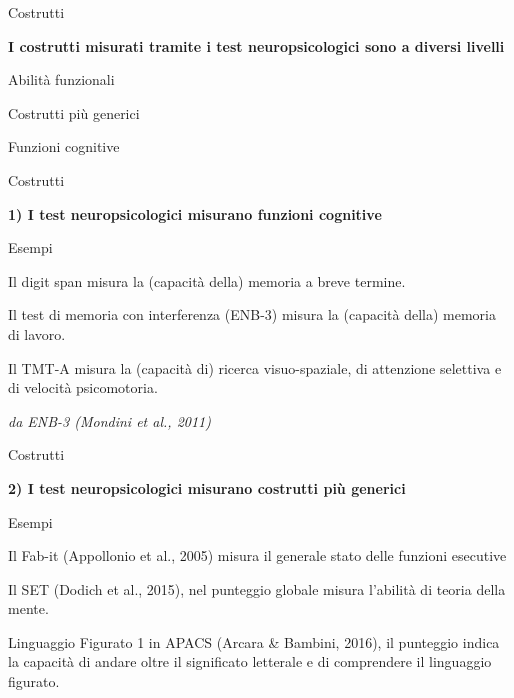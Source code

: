 \documentclass[
  ignorenonframetext,
]{beamer}
\begin{document}
\begin{frame}{Costrutti}
\label{costrutti-1}
\begin{center}
  \textbf{I costrutti misurati tramite i test neuropsicologici sono a diversi livelli}
  \vspace{2em}

  Abilità funzionali
  
  {\small Costrutti più generici}
  
  {\footnotesize Funzioni cognitive}
\end{center}
\end{frame}

\begin{frame}{Costrutti}
\label{costrutti-2}
\begin{center}
  \textbf{1) I test neuropsicologici misurano funzioni cognitive}
\end{center}
\vspace{2em}

Esempi

Il digit span misura la (capacità della) memoria a breve termine.

Il test di memoria con interferenza (ENB-3) misura la (capacità della)
memoria di lavoro.

Il TMT-A misura la (capacità di) ricerca visuo-spaziale, di attenzione
selettiva e di velocità psicomotoria.

\begin{flushright}
  \textit{da ENB-3 (Mondini et al., 2011)}
\end{flushright}
\end{frame}

\begin{frame}{Costrutti}
\label{costrutti-3}
\begin{center}
  \textbf{2) I test neuropsicologici misurano costrutti più generici}
\end{center}
\vspace{2em}

Esempi

Il Fab-it (Appollonio et al., 2005) misura il generale stato delle
funzioni esecutive

Il SET (Dodich et al., 2015), nel punteggio globale misura l'abilità di
teoria della mente.

Linguaggio Figurato 1 in APACS (Arcara \& Bambini, 2016), il punteggio
indica la capacità di andare oltre il significato letterale e di
comprendere il linguaggio figurato.
\end{frame}
\end{document}
